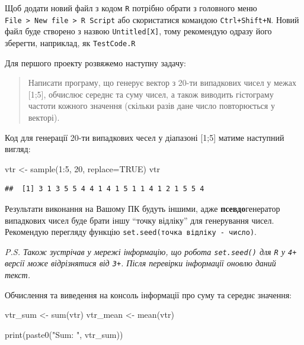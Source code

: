 \documentclass[
]{book}
\newenvironment{Shaded}{\begin{snugshade}}{\end{snugshade}}
\newcommand{\AttributeTok}[1]{\textcolor[rgb]{0.77,0.63,0.00}{#1}}
\newcommand{\ConstantTok}[1]{\textcolor[rgb]{0.00,0.00,0.00}{#1}}
\newcommand{\DecValTok}[1]{\textcolor[rgb]{0.00,0.00,0.81}{#1}}
\newcommand{\FunctionTok}[1]{\textcolor[rgb]{0.00,0.00,0.00}{#1}}
\newcommand{\NormalTok}[1]{#1}
\newcommand{\OtherTok}[1]{\textcolor[rgb]{0.56,0.35,0.01}{#1}}
\newcommand{\SpecialCharTok}[1]{\textcolor[rgb]{0.00,0.00,0.00}{#1}}
\newcommand{\StringTok}[1]{\textcolor[rgb]{0.31,0.60,0.02}{#1}}
\begin{document}
Щоб додати новий файл з кодом \texttt{R} потрібно обрати з головного меню \texttt{File\ \textgreater{}\ New\ file\ \textgreater{}\ R\ Script} або скористатися командою \texttt{Ctrl+Shift+N}. Новий файл буде створено з назвою \texttt{Untitled{[}X{]}}, тому рекомендую одразу його зберегти, наприклад, як \texttt{TestCode.R}

Для першого проекту розвяжемо наступну задачу:

\begin{quote}
Написати програму, що генерує вектор з 20-ти випадкових чисел у межах {[}1;5{]}, обчислює середнє та суму чисел, а також виводить гістограму частоти кожного значення (скільки разів дане число повторюється у векторі).
\end{quote}

Код для генерації 20-ти випадкових чесел у діапазоні {[}1;5{]} матиме наступний вигляд:

\begin{Shaded}
\begin{Highlighting}[]
\NormalTok{vtr }\OtherTok{\textless{}{-}} \FunctionTok{sample}\NormalTok{(}\DecValTok{1}\SpecialCharTok{:}\DecValTok{5}\NormalTok{, }\DecValTok{20}\NormalTok{, }\AttributeTok{replace=}\ConstantTok{TRUE}\NormalTok{)}
\NormalTok{vtr}
\end{Highlighting}
\end{Shaded}

\begin{verbatim}
##  [1] 3 1 3 5 5 4 4 1 4 1 5 1 1 4 1 2 1 5 5 4
\end{verbatim}

Результати виконання на Вашому ПК будуть іншими, адже \textbf{псевдо}генератор випадкових чисел буде брати іншу ``точку відліку'' для генерування чисел. Рекомендую перегляду функцію \texttt{set.seed(точка\ відліку\ -\ число)}.

\emph{P.S. Також зустрічав у мережі інформацію, що робота \texttt{set.seed()} для \texttt{R} у \texttt{4+} версії може відрізнятися від \texttt{3+}. Після перевірки інформації оновлю даний текст.}

Обчислення та виведення на консоль інформації про суму та середнє значення:

\begin{Shaded}
\begin{Highlighting}[]
\NormalTok{vtr\_sum }\OtherTok{\textless{}{-}} \FunctionTok{sum}\NormalTok{(vtr)}
\NormalTok{vtr\_mean }\OtherTok{\textless{}{-}} \FunctionTok{mean}\NormalTok{(vtr)}

\FunctionTok{print}\NormalTok{(}\FunctionTok{paste0}\NormalTok{(}\StringTok{"Sum: "}\NormalTok{, vtr\_sum))}
\end{Highlighting}
\end{Shaded}
\end{document}

